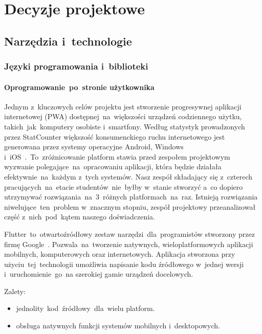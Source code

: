 
\chapter{Decyzje projektowe}
\label{ch:decyzje-projektowe}

\section{Narzędzia i~technologie}
\label{sec:narzedzia-i-technologie}

\subsection{Języki programowania i~biblioteki}
\label{subsec:jezyki-programowania-i-biblioteki}

\subsubsection{Oprogramowanie~po~stronie użytkownika}
Jednym z~kluczowych celów projektu jest stworzenie progresywnej aplikacji internetowej (PWA) dostępnej~na~większości urządzeń codziennego użytku, takich~jak~komputery osobiste i~smartfony.
Według statystyk prowadzonych przez StatCounter większość konsumenckiego ruchu internetowego jest generowana przez systemy operacyjne Android, Windows i~iOS~\cite{statcounter-os-shares}\@.~To~zróżnicowanie platform stawia przed zespołem projektowym wyzwanie polegające~na~opracowaniu aplikacji, która będzie działała efektywnie~na~każdym z~tych systemów.
Nasz zespół składający się z~czterech pracujących~na~etacie studentów~nie~byłby w~stanie stworzyć a~co dopiero utrzymywać rozwiązania~na~3~różnych platformach~na~raz.
Istnieją rozwiązania niwelujące~ten~problem w~znacznym stopniu, zespół projektowy przeanalizował część z~nich~pod~kątem naszego doświadczenia.

\indent Flutter~to~otwartoźródłowy zestaw narzędzi~dla~programistów stworzony przez firmę Google~\cite{flutter-quick-start}.
Pozwala~na~tworzenie natywnych, wieloplatformowych aplikacji mobilnych, komputerowych oraz internetowych.
Aplikacja stworzona przy użyciu~tej~technologii umożliwia napisanie kodu źródłowego w~jednej wersji i~uruchomienie~go~na szerokiej gamie urządzeń docelowych.

Zalety:
\begin{itemize}
    \item jednolity~kod~źródłowy~dla~wielu platform.
    \item obsługa natywnych funkcji systemów mobilnych i~desktopowych.
\end{itemize}

